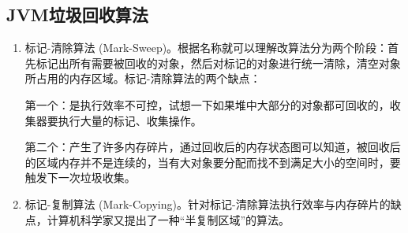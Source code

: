 \documentclass[../../../interview-questions.tex]{subfiles}
\begin{document}
\subsection{JVM垃圾回收算法}

\begin{enumerate}
    \item{标记-清除算法 (Mark-Sweep)。}根据名称就可以理解改算法分为两个阶段：首先标记出所有需要被回收的对象，然后对标记的对象进行统一清除，清空对象所占用的内存区域。标记-清除算法的两个缺点：

    第一个：是执行效率不可控，试想一下如果堆中大部分的对象都可回收的，收集器要执行大量的标记、收集操作。
    
    第二个：产生了许多内存碎片，通过回收后的内存状态图可以知道，被回收后的区域内存并不是连续的，当有大对象要分配而找不到满足大小的空间时，要触发下一次垃圾收集。
    \item{标记-复制算法 (Mark-Copying)。}针对标记-清除算法执行效率与内存碎片的缺点，计算机科学家又提出了一种“半复制区域”的算法。


\end{enumerate}
\end{document}
